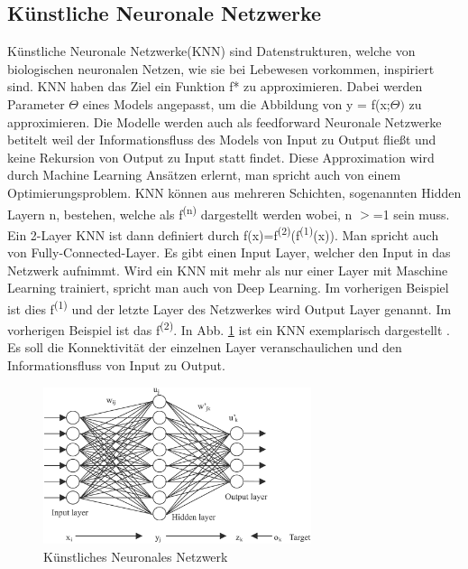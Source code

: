 \documentclass{llncs}
\begin{document}
\subsection{Künstliche Neuronale Netzwerke}

Künstliche Neuronale Netzwerke(KNN) sind Datenstrukturen, welche von biologischen neuronalen Netzen, wie sie bei Lebewesen vorkommen, inspiriert sind. KNN haben das Ziel ein Funktion f* zu approximieren. Dabei werden Parameter $\Theta$ eines Models angepasst, um die Abbildung von y = f(x;$\Theta)$ zu approximieren. Die Modelle werden auch als feedforward Neuronale Netzwerke betitelt weil der Informationsfluss des Models von Input zu Output fließt und keine Rekursion von Output zu Input statt findet. Diese Approximation wird durch Machine Learning Ansätzen erlernt, man spricht auch von einem Optimierungsproblem. KNN können aus mehreren Schichten, sogenannten Hidden Layern n, bestehen, welche als f\textsuperscript{(n)} dargestellt werden wobei, n $>$=1 sein muss. Ein 2-Layer KNN ist dann definiert durch f(x)=f\textsuperscript{(2)}(f\textsuperscript{(1)}(x)). Man spricht auch von Fully-Connected-Layer. Es gibt einen Input Layer, welcher den Input in das Netzwerk aufnimmt. Wird ein KNN mit mehr als nur einer Layer mit Maschine Learning trainiert, spricht man auch von Deep Learning. Im vorherigen Beispiel ist dies f\textsuperscript{(1)} und der letzte Layer des Netzwerkes wird Output Layer genannt. Im vorherigen Beispiel ist das f\textsuperscript{(2)}. In Abb. \ref{fig:Bild1} ist ein KNN exemplarisch dargestellt \cite{Grundlagen}. Es soll die Konnektivität der einzelnen Layer veranschaulichen und den Informationsfluss von Input zu Output.
\newpage
\begin{figure}[htbp]
	\centering
	\includegraphics[width=0.7\textwidth]{neuronalesnetzwerk.png}
	\caption{Künstliches Neuronales Netzwerk\protect\cite{annpic}}
	\label{fig:Bild1}
\end{figure}
~\\\\
\end{document}
